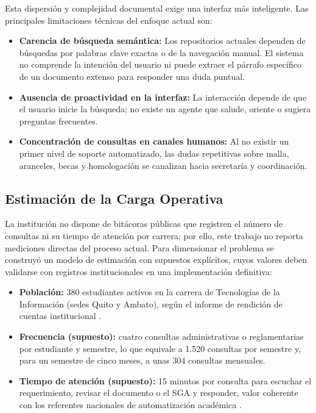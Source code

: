 Esta dispersión y complejidad documental exige una interfaz más inteligente. Las principales limitaciones técnicas del enfoque actual son:
\begin{itemize}
    \item \textbf{Carencia de búsqueda semántica:} Los repositorios actuales dependen de búsquedas por palabras clave exactas o de la navegación manual. El sistema no comprende la intención del usuario ni puede extraer el párrafo específico de un documento extenso para responder una duda puntual.
    \item \textbf{Ausencia de proactividad en la interfaz:} La interacción depende de que el usuario inicie la búsqueda; no existe un agente que salude, oriente o sugiera preguntas frecuentes.
    \item \textbf{Concentración de consultas en canales humanos:} Al no existir un primer nivel de soporte automatizado, las dudas repetitivas sobre malla, aranceles, becas y homologación se canalizan hacia secretaría y coordinación.
\end{itemize}

\subsection{Estimación de la Carga Operativa}
La institución no dispone de bitácoras públicas que registren el número de consultas ni su tiempo de atención por carrera; por ello, este trabajo no reporta mediciones directas del proceso actual. Para dimensionar el problema se construyó un modelo de estimación con supuestos explícitos, cuyos valores deben validarse con registros institucionales en una implementación definitiva:

\begin{itemize}
    \item \textbf{Población:} 380 estudiantes activos en la carrera de Tecnologías de la Información (sedes Quito y Ambato), según el informe de rendición de cuentas institucional \cite{uti2025rc}.
    \item \textbf{Frecuencia (supuesto):} cuatro consultas administrativas o reglamentarias por estudiante y semestre, lo que equivale a 1.520 consultas por semestre y, para un semestre de cinco meses, a unas 304 consultas mensuales.
    \item \textbf{Tiempo de atención (supuesto):} 15 minutos por consulta para escuchar el requerimiento, revisar el documento o el SGA y responder, valor coherente con los referentes nacionales de automatización académica \cite{diaz2025asistente}.
\end{itemize}

